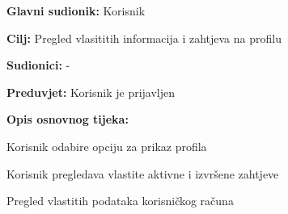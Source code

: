 		
			\noindent {}
			\begin{packed_item}
				
				\item \textbf{Glavni sudionik: }Korisnik
				\item  \textbf{Cilj:} Pregled vlasititih informacija i zahtjeva na profilu
				\item  \textbf{Sudionici:} -
				\item  \textbf{Preduvjet:} Korisnik je prijavljen
				\item  \textbf{Opis osnovnog tijeka:}
				
				\item[] \begin{packed_enum}
					
					\item Korisnik odabire opciju za prikaz profila
					\item Korisnik pregledava vlastite aktivne i izvršene zahtjeve
					\item Pregled vlastitih podataka korisničkog računa
				\end{packed_enum}
				
				
			\end{packed_item}
		
